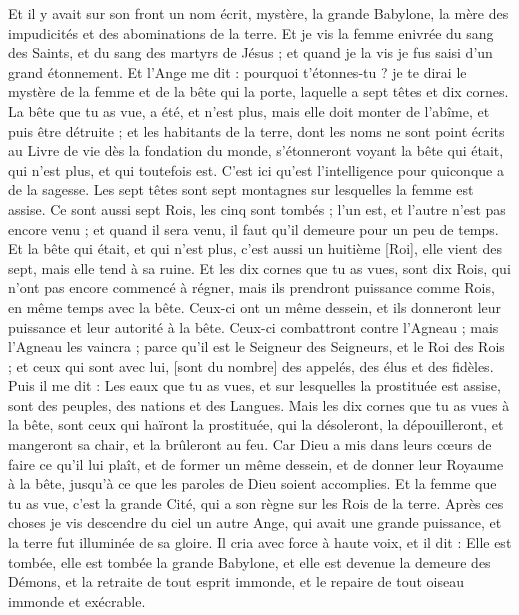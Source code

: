 \begin{multicols}{2}
Et il y avait sur son front un nom écrit, mystère, la grande Babylone, la mère des impudicités et des abominations de la terre.
Et je vis la femme enivrée du sang des Saints, et du sang des martyrs de Jésus ; et quand je la vis je fus saisi d'un grand étonnement.
Et l'Ange me dit : pourquoi t'étonnes-tu ? je te dirai le mystère de la femme et de la bête qui la porte, laquelle a sept têtes et dix cornes.
La bête que tu as vue, a été, et n'est plus, mais elle doit monter de l'abîme, et puis être détruite ; et les habitants de la terre, dont les noms ne sont point écrits au Livre de vie dès la fondation du monde, s'étonneront voyant la bête qui était, qui n'est plus, et qui toutefois est.
C'est ici qu'est l'intelligence pour quiconque a de la sagesse. Les sept têtes sont sept montagnes sur lesquelles la femme est assise.
Ce sont aussi sept Rois, les cinq sont tombés ; l'un est, et l'autre n'est pas encore venu ; et quand il sera venu, il faut qu'il demeure pour un peu de temps.
Et la bête qui était, et qui n'est plus, c'est aussi un huitième [Roi], elle vient des sept, mais elle tend à sa ruine.
Et les dix cornes que tu as vues, sont dix Rois, qui n'ont pas encore commencé à régner, mais ils prendront puissance comme Rois, en même temps avec la bête.
Ceux-ci ont un même dessein, et ils donneront leur puissance et leur autorité à la bête.
Ceux-ci combattront contre l'Agneau ; mais l'Agneau les vaincra ; parce qu'il est le Seigneur des Seigneurs, et le Roi des Rois ; et ceux qui sont avec lui, [sont du nombre] des appelés, des élus et des fidèles.
Puis il me dit : Les eaux que tu as vues, et sur lesquelles la prostituée est assise, sont des peuples, des nations et des Langues.
Mais les dix cornes que tu as vues à la bête, sont ceux qui haïront la prostituée, qui la désoleront, la dépouilleront, et mangeront sa chair, et la brûleront au feu.
Car Dieu a mis dans leurs cœurs de faire ce qu'il lui plaît, et de former un même dessein, et de donner leur Royaume à la bête, jusqu'à ce que les paroles de Dieu soient accomplies.
Et la femme que tu as vue, c'est la grande Cité, qui a son règne sur les Rois de la terre.
\VerseOne{}Après ces choses je vis descendre du ciel un autre Ange, qui avait une grande puissance, et la terre fut illuminée de sa gloire.
Il cria avec force à haute voix, et il dit : Elle est tombée, elle est tombée la grande Babylone, et elle est devenue la demeure des Démons, et la retraite de tout esprit immonde, et le repaire de tout oiseau immonde et exécrable.

\end{multicols}
